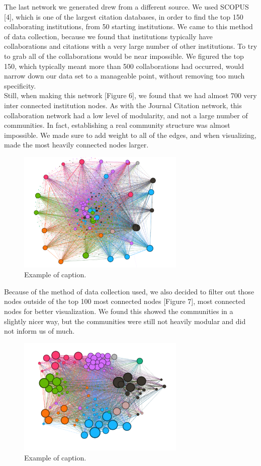 \documentclass[times, 10pt,twocolumn]{article}
\begin{document}
The last network we generated drew from a different source. We used SCOPUS [4], which is one of the largest citation databases, in order to find the top 150 collaborating institutions, from 50 starting institutions. We came to this method of data collection, because we found that institutions typically have collaborations and citations with a very large number of other institutions. To try to grab all of the collaborations would be near impossible. We figured the top 150, which typically meant more than 500 collaborations had occurred, would narrow down our data set to a manageable point, without removing too much specificity. \\

Still, when making this network [Figure 6], we found that we had almost 700 very inter connected institution nodes. As with the Journal Citation network, this collaboration network had a low level of modularity, and not a large number of communities. In fact, establishing a real community structure was almost impossible. We made sure to add weight to all of the edges, and when visualizing, made the most heavily connected nodes larger. \\

\begin{figure}[h]
   \includegraphics[width=8cm]{figure6.png}
   \caption{Example of caption.}
\end{figure}

Because of the method of data collection used, we also decided to filter out those nodes outside of the top 100 most connected nodes [Figure 7], most connected nodes for better visualization.  We found this showed the communities in a slightly nicer way, but the communities were still not heavily modular and did not inform us of much.    \\

\begin{figure}[h]
   \includegraphics[width=8cm]{figure7.png}
   \caption{Example of caption.}
\end{figure}
\end{document}
